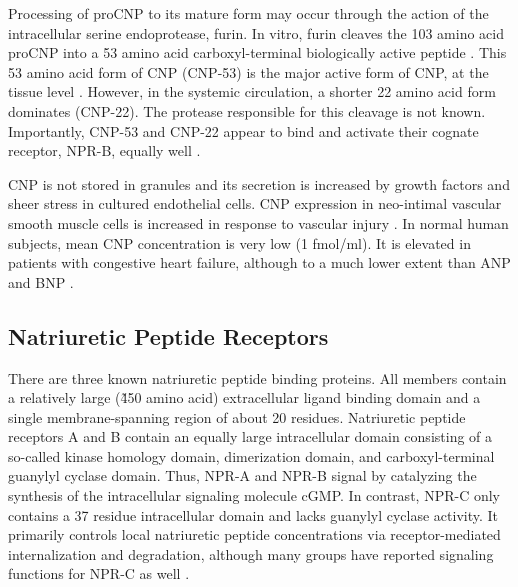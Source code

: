 \documentclass[14pt,a4paper,onecolumn]{extarticle}
\begin{document}

Processing of proCNP to its mature form may occur through the action of the intracellular serine endoprotease, furin. In vitro, furin cleaves the 103 amino acid proCNP into a 53 amino acid carboxyl-terminal biologically active peptide \citep{Wu2003a}. This 53 amino acid form of CNP (CNP-53) is the major active form of CNP, at the tissue level \citep{Brown1997}. However, in the systemic circulation, a shorter 22 amino acid form dominates (CNP-22). The protease responsible for this cleavage is not known. Importantly, CNP-53 and CNP-22 appear to bind and activate their cognate receptor, NPR-B, equally well \citep{Yeung1996}.

CNP is not stored in granules and its secretion is increased by growth factors \citep{Suga1993} \citep{Suga1992b} and sheer stress \citep{Chun1997} in cultured endothelial cells. CNP expression in neo-intimal vascular smooth muscle cells is increased in response to vascular injury \citep{Brown1997}. In normal human subjects, mean CNP concentration is very low (1 fmol/ml). It is elevated in patients with congestive heart failure, although to a much lower extent than ANP and BNP \citep{Charles2006} \citep{Del-Ry2005} \citep{Kalra2003}.

\subsection{Natriuretic Peptide Receptors}
There are three known natriuretic peptide binding proteins. All members contain a relatively large (\~450 amino acid) extracellular ligand binding domain and a single membrane-spanning region of about 20 residues. Natriuretic peptide receptors A and B contain an equally large intracellular domain consisting of a so-called kinase homology domain, dimerization domain, and carboxyl-terminal guanylyl cyclase domain. Thus, NPR-A and NPR-B signal by catalyzing the synthesis of the intracellular signaling molecule cGMP. In contrast, NPR-C only contains a 37 residue intracellular domain and lacks guanylyl cyclase activity. It primarily controls local natriuretic peptide concentrations via receptor-mediated internalization and degradation, although many groups have reported signaling functions for NPR-C as well \citep{Rose2008}.
\end{document}
